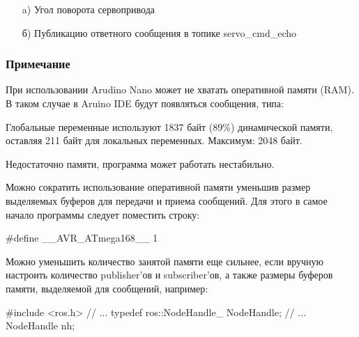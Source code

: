 \begin{enumerate}
    \item[a)] Угол поворота сервопривода
    \item[б)] Публикацию ответного сообщения в топике servo\_cmd\_echo 
\end{enumerate}

\subsubsection*{Примечание}
При использовании Arudino Nano может не хватать оперативной памяти (RAM). В таком случае в Aruino IDE 
будут появляться сообщения, типа:

Глобальные переменные используют 1837 байт (89\%) динамической памяти, оставляя 211 байт для локальных 
переменных. Максимум: 2048 байт.

Недостаточно памяти, программа может работать нестабильно.

Можно сократить использование оперативной памяти уменьшив размер выделяемых 
буферов для передачи и приема сообщений. Для этого в самое начало программы следует поместить строку:

\#define \_\_AVR\_ATmega168\_\_ 1

Можно уменьшить количество занятой памяти еще сильнее, если вручную настроить количество publisher'ов и subscriber'ов, а также размеры буферов памяти, выделяемой для сообщений, например:

\#include <ros.h>
// ...
typedef ros::NodeHandle\_<ArduinoHardware, 3, 3, 100, 100> NodeHandle;
// ...
NodeHandle nh;